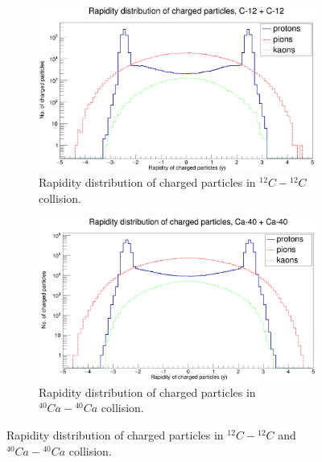 \documentclass[12pt, twocolumn]{article}
\begin{document}
\begin{figure}[h]
\centering
\begin{subfigure}[h]{0.49\textwidth}
\centering
\includegraphics[scale=0.14]{RapidityC12.png}
\caption{Rapidity distribution of charged particles in $^{12}C-{^{12}C}$ collision.}
\label{Rapidity distribution of charged particles in C12-C12 collision.}
\end{subfigure}
\hfill
\begin{subfigure}[h]{0.49\textwidth}
\centering
\includegraphics[scale=0.14]{RapidityCa40.png}
\caption{Rapidity distribution of charged particles in $^{40}Ca-{^{40}Ca}$ collision.}
\label{Rapidity distribution of charged particles in Ca40-Ca40 collision.}
\end{subfigure}
\caption{Rapidity distribution of charged particles in $^{12}C-{^{12}C}$ and $^{40}Ca-{^{40}Ca}$ collision.}
\label{Rapidity distribution of charged particles in C12-C12 and Ca40-Ca40 collision.}
\end{figure}

\end{document}
